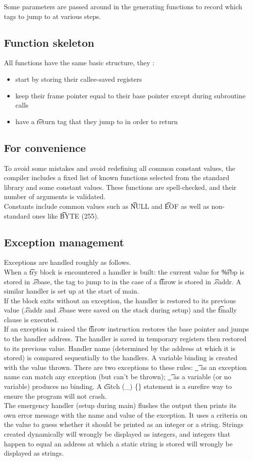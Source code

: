 Some parameters are passed around in the generating functions to record which tags to jump to at various steps.

\subsection{Function skeleton}
All functions have the same basic structure, they :
\begin{itemize}
    \item start by storing their callee-saved registers
    \item keep their frame pointer equal to their base pointer except during subroutine calls
    \item have a \t{return} tag that they jump to in order to return
\end{itemize}

\subsection{For convenience}
To avoid some mistakes and avoid redefining all common constant values, the compiler includes a fixed list of known functions selected from the standard library and some constant values. These functions are spell-checked, and their number of arguments is validated.\\
Constants include common values such as \t{NULL} and \t{EOF} as well as non-standard ones like \t{BYTE} (255).

\subsection{Exception management}
Exceptions are handled roughly as follows.\\
When a \t{try} block is encountered a handler is built: the current value for \t{\%rbp} is stored in \t{.ebase}, the tag to jump to in the case of a \t{throw} is stored in \t{.eaddr}. A similar handler is set up at the start of main.\\
If the block exits without an exception, the handler is restored to its previous value (\t{.eaddr} and \t{.ebase} were saved on the stack during setup) and the \t{finally} clause is executed.\\
If an exception is raised the \t{throw} instruction restores the base pointer and jumps to the handler address. The handler is saved in temporary registers then restored to its previous value. Handler name (determined by the address at which it is stored) is compared sequentially to the handlers. A variable binding is created with the value thrown. There are two exceptions to these rules: \t{\_} as an exception name can match any exception (but can't be thrown); \t{\_} as a variable (or no variable) produces no binding. A \t{catch (\_) \{\}} statement is a surefire way to ensure the program will not crash.\\
The emergency handler (setup during main) flushes the output then prints its own error message with the name and value of the exception. It uses a criteria on the value to guess whether it should be printed as an integer or a string. Strings created dynamically will wrongly be displayed as integers, and integers that happen to equal an address at which a static string is stored will wrongly be displayed as strings.
